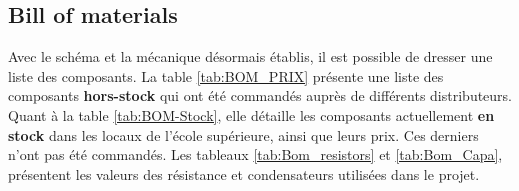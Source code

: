 \clearpage

\subsection{Bill of materials} \label{ssec:BOM}
Avec le schéma et la mécanique désormais établis, il est possible de dresser une liste des composants. La table \ref{tab:BOM_PRIX} présente une liste des composants \textbf{hors-stock} qui ont été commandés auprès de différents distributeurs. Quant à la table \ref{tab:BOM-Stock}, elle détaille les composants actuellement \textbf{en stock} dans les locaux de l'école supérieure, ainsi que leurs prix. Ces derniers n'ont pas été commandés. Les tableaux \ref{tab:Bom_resistors} et \ref{tab:Bom_Capa}, présentent les valeurs des résistance et condensateurs utilisées dans le projet.

